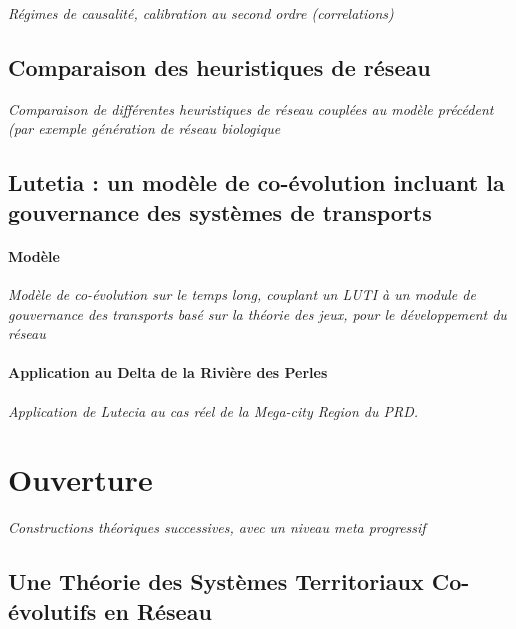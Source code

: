 \textit{Régimes de causalité, calibration au second ordre (correlations)}

\subsection{Comparaison des heuristiques de réseau}

\textit{Comparaison de différentes heuristiques de réseau couplées au modèle précédent (par exemple génération de réseau biologique \cite{raimbault2015labex}}



\subsection{Lutetia : un modèle de co-évolution incluant la gouvernance des systèmes de transports}

\paragraph{Modèle}

\textit{Modèle de co-évolution sur le temps long, couplant un LUTI à un module de gouvernance des transports basé sur la théorie des jeux, pour le développement du réseau~\cite{le2015modeling}}

\paragraph{Application au Delta de la Rivière des Perles}

\textit{Application de Lutecia au cas réel de la Mega-city Region du PRD.}





\section{Ouverture}




\textit{Constructions théoriques successives, avec un niveau meta progressif}

\subsection{Une Théorie des Systèmes Territoriaux Co-évolutifs en Réseau}

